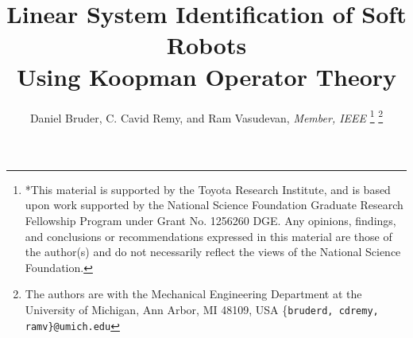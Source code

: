 \documentclass[letterpaper, 10 pt, conference]{ieeeconf}
\title{\LARGE \bf
Linear System Identification of Soft Robots \\ Using Koopman Operator Theory
}
\author{Daniel Bruder, %
        C. Cavid Remy, %
        and Ram Vasudevan, \emph{Member, IEEE} %
\thanks{*This material is supported by the Toyota Research Institute, and is based upon work supported by the National Science Foundation Graduate Research Fellowship Program under Grant No. 1256260 DGE. Any opinions, findings, and conclusions or recommendations expressed in this material are those of the author(s) and do not necessarily reflect the views of the National Science Foundation.}%
\thanks{The authors are with the Mechanical Engineering Department at the 
        University of Michigan, Ann Arbor, MI 48109, USA
        \{\tt\small bruderd, cdremy, ramv\}@umich.edu}%
}
\begin{document}
\maketitle
\thispagestyle{empty}
\pagestyle{empty}

\begin{abstract}

\end{abstract}

\IEEEpeerreviewmaketitle









% 




\end{document}
